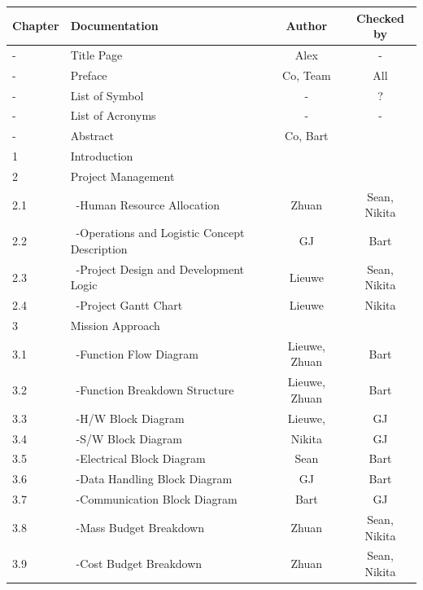 \newpage
\begin{center}
\begin{longtable}{|l|l|c|c|}\hline
 Chapter & Documentation                      & Author & Checked by \\\hline 
 -       & Title Page                           & Alex & - \\\hline                  
 -       & Preface                              & Co, Team& All \\\hline
 -       & List of Symbol                       & - & ? \\\hline
 -       & List of Acronyms                     & - & - \\\hline
 -       & Abstract                             & Co, Bart &\\\hline
 1       & Introduction                         &&\\\hline\hline
 2       & Project Management                   &&\\\hline
 2.1     & \ -Human Resource Allocation         & Zhuan & Sean, Nikita \\\hline
 2.2     & \ -Operations and Logistic Concept Description & GJ & Bart \\\hline
 2.3     & \ -Project Design and Development Logic & Lieuwe & Sean, Nikita \\\hline
 2.4     & \ -Project Gantt Chart               & Lieuwe & Nikita \\\hline\hline
 3       & Mission Approach                     &&\\\hline
 3.1     & \ -Function Flow Diagram             & Lieuwe, Zhuan & Bart\\\hline
 3.2     & \ -Function Breakdown Structure      & Lieuwe, Zhuan & Bart \\\hline
 3.3     & \ -H/W Block Diagram                 & Lieuwe, & GJ \\\hline
 3.4     & \ -S/W Block Diagram                 & Nikita & GJ \\\hline
 3.5     & \ -Electrical Block Diagram          & Sean & Bart \\\hline
 3.6     & \ -Data Handling Block Diagram       & GJ & Bart\\\hline
 3.7     & \ -Communication Block Diagram       & Bart & GJ\\\hline
 3.8     & \ -Mass Budget Breakdown             & Zhuan & Sean, Nikita \\\hline
 3.9     & \ -Cost Budget Breakdown             & Zhuan & Sean, Nikita \\\hline

\end{longtable}
\end{center}
